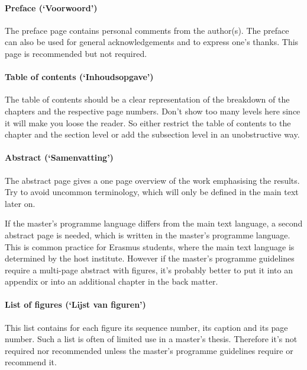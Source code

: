 \documentclass[11pt,article,oneside,a4paper]{memoir}
\newcommand\Dutch[1]{`\foreignlanguage{dutch}{#1}'}
\begin{document}
\paragraph{Preface (\Dutch{Voorwoord})} The preface page contains personal
comments from the author(s). The preface can also be used for general
acknowledgements and to express one's thanks. This page is recommended but
not required.

\paragraph{Table of contents (\Dutch{Inhoudsopgave})} The table of contents
should be a clear representation of the breakdown of the chapters and the
respective page numbers. Don't show too many levels here since it will make
you loose the reader. So either restrict the table of contents to the
chapter and the section level or add the subsection level in an
unobstructive way.

\paragraph{Abstract (\Dutch{Samenvatting})} The abstract page gives a one
page overview of the work emphasising the results. Try to avoid uncommon
terminology, which will only be defined in the main text later on.

If the master's programme language differs from the main text language, a
second abstract page is needed, which is written in the master's programme
language. This is common practice for Erasmus students, where the main text
language is determined by the host institute. However if the master's programme
guidelines require a multi-page abstract with figures, it's probably better to
put it into an appendix or into an additional chapter in the back matter.

\paragraph{List of figures (\Dutch{Lijst van figuren})} This list contains for
each figure its sequence number, its caption and its page number. Such a list
is often of limited use in a master's thesis. Therefore it's not required nor
recommended unless the master's programme guidelines require or recommend it.
\end{document}
